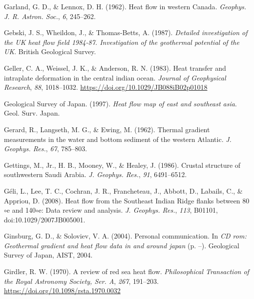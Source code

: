 \documentclass[draft,linenumbers]{agujournal2018}
\begin{document}
\leavevmode{}%
Garland, G. D., \& Lennox, D. H. (1962). Heat flow in western {Canada}.
\emph{Geophys. J. R. Astron. Soc.}, \emph{6}, 245--262.

\leavevmode{}%
Gebski, J. S., Wheildon, J., \& Thomas-Betts, A. (1987). \emph{Detailed
investigation of the UK heat flow field 1984-87. Investigation of the
geothermal potential of the UK}. British Geological Survey.

\leavevmode{}%
Geller, C. A., Weissel, J. K., \& Anderson, R. N. (1983). Heat transfer
and intraplate deformation in the central indian ocean. \emph{Journal of
Geophysical Research}, \emph{88}, 1018--1032.
\url{https://doi.org/10.1029/JB088iB02p01018}

\leavevmode{}%
Geological Survey of Japan. (1997). \emph{Heat flow map of east and
southeast asia}. Geol. Surv. Japan.

\leavevmode{}%
Gerard, R., Langseth, M. G., \& Ewing, M. (1962). Thermal gradient
measurements in the water and bottom sediment of the western {Atlantic}.
\emph{J. Geophys. Res.}, \emph{67}, 785--803.

\leavevmode{}%
Gettings, M., Jr., H. B., Mooney, W., \& Healey, J. (1986). Crustal
structure of southwestern {Saudi Arabia}. \emph{J. Geophys. Res.},
\emph{91}, 6491--6512.

\leavevmode{}%
Géli, L., Lee, T. C., Cochran, J. R., Francheteau, J., Abbott, D.,
Labails, C., \& Appriou, D. (2008). Heat flow from the {Southeast Indian
Ridge} flanks between 80\(\circ\)e and 140\(\circ\)e: Data review and
analysis. \emph{J. Geophys. Res.}, \emph{113}, B01101,
doi:10.1029/2007JB005001.

\leavevmode{}%
Ginsburg, G. D., \& Soloviev, V. A. (2004). Personal communication. In
\emph{CD rom: Geothermal gradient and heat flow data in and around
japan} (p. --). Geological Survey of Japan, AIST, 2004.

\leavevmode{}%
Girdler, R. W. (1970). A review of red sea heat flow.
\emph{Philosophical Transaction of the Royal Astronomy Society, Ser. A},
\emph{267}, 191--203. \url{https://doi.org/10.1098/rsta.1970.0032}
\end{document}
